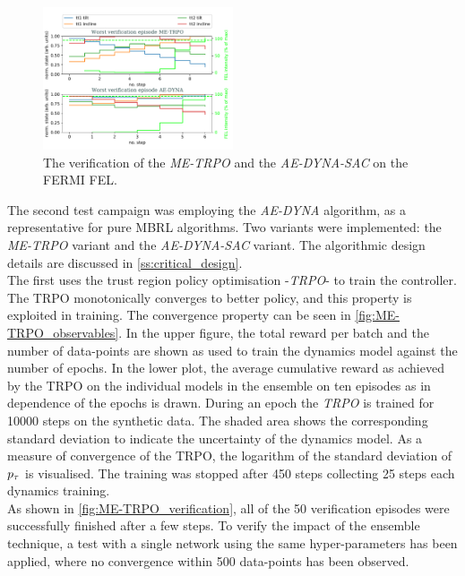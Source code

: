 \documentclass[
reprint,
amsmath,amssymb,amsfonts,clevref,
aps,
prstab,
]{revtex4-2}
\begin{document}
	\begin{figure}
	\centering
	\includegraphics*[width=0.5\textwidth]{Figures/Worst_episode_MBRL.pdf}
	\caption{The verification of the \emph{ME-TRPO} and the \emph{AE-DYNA-SAC} on the FERMI FEL.}
	\label{fig:Worst_episode_MBRL}
	\end{figure}
	The second test campaign was employing the \emph{AE-DYNA} algorithm, as a representative for pure MBRL algorithms. Two variants were implemented: the \emph{ME-TRPO} variant and the \emph{AE-DYNA-SAC} variant. The algorithmic design details are discussed in \cref{ss:critical_design}. 
	\\ The first uses the trust region policy optimisation -\emph{TRPO}- \cite{Schulman2015} to train the controller. The TRPO monotonically converges to better policy, and this property is exploited in training. The convergence property can be seen in \cref{fig:ME-TRPO_observables}. In the upper figure, the total reward per batch and the number of data-points are shown as used to train the dynamics model against the number of epochs. In the lower plot, the average cumulative reward as achieved by the TRPO on the individual models in the ensemble on ten episodes as in dependence of the epochs is drawn. During an epoch the \emph{TRPO} is trained for 10000 steps on the synthetic data. The shaded area shows the corresponding standard deviation to indicate the uncertainty of the dynamics model. As a measure of convergence of the TRPO, the logarithm of the standard deviation of $p_\tau$ is visualised. The training was stopped after 450 steps collecting 25 steps each dynamics training.
	\\ As shown in \cref{fig:ME-TRPO_verification}, all of the 50 verification episodes were successfully finished after a few steps. To verify the impact of the ensemble technique, a test with a single network using the same hyper-parameters has been applied, where no convergence within 500 data-points has been observed. \\
\end{document}
